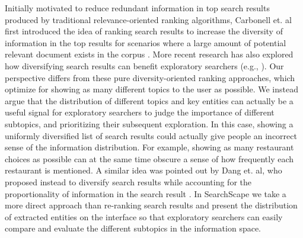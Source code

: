 Initially motivated to reduce redundant information in top search results produced by traditional relevance-oriented ranking algorithms, Carbonell et. al first introduced the idea of ranking search results to increase the diversity of information in the top results for scenarios where a large amount of potential relevant document exists in the corpus \cite{carbonell1998use}. More recent research has also explored how diversifying search results can benefit exploratory searchers (e.g., \cite{jin2013interactive}). Our perspective differs from these pure diversity-oriented ranking approaches, which optimize for showing as many different topics to the user as possible. We instead argue that the distribution of different topics and key entities can actually be a useful signal for exploratory searchers to judge the importance of different subtopics, and prioritizing their subsequent exploration. In this case, showing a uniformly diversified list of search results could actually give people an incorrect sense of the information distribution. For example, showing as many restaurant choices as possible can at the same time obscure a sense of how frequently each restaurant is mentioned. A similar idea was pointed out by Dang et. al, who proposed instead to diversify search results while accounting for the proportionality of information in the search result \cite{dang2012diversity}. In SearchScape we take a more direct approach than re-ranking search results and  present the distribution of extracted entities on the interface so that exploratory searchers can easily compare and evaluate the different subtopics in the information space.






